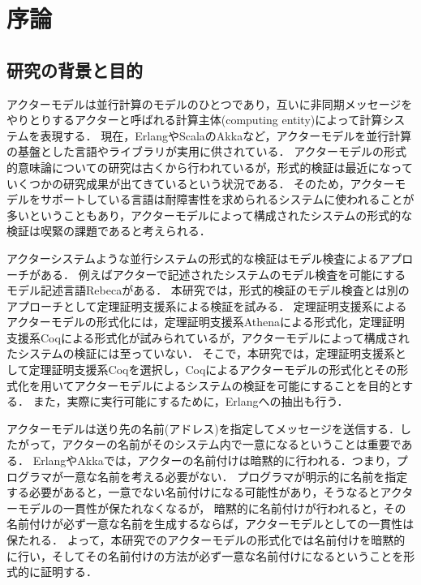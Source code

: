 \chapter{序論}
\label{chapter:intro}

\section{研究の背景と目的}
アクターモデル\cite{Agha:1986aa}は並行計算のモデルのひとつであり，互いに非同期メッセージをやりとりするアクターと呼ばれる計算主体(computing entity)によって計算システムを表現する．
現在，Erlang\cite{Erlang}やScala\cite{Scala}のAkka\cite{Akka}など，アクターモデルを並行計算の基盤とした言語やライブラリが実用に供されている．
アクターモデルの形式的意味論についての研究は古くから行われているが，形式的検証は最近になっていくつかの研究成果が出てきているという状況である．
そのため，アクターモデルをサポートしている言語は耐障害性を求められるシステムに使われることが多いということもあり，アクターモデルによって構成されたシステムの形式的な検証は喫緊の課題であると考えられる．

アクターシステムような並行システムの形式的な検証はモデル検査によるアプローチがある．
例えばアクターで記述されたシステムのモデル検査を可能にするモデル記述言語Rebeca\cite{Sirjani:2011aa}がある．
本研究では，形式的検証のモデル検査とは別のアプローチとして定理証明支援系による検証を試みる．
定理証明支援系によるアクターモデルの形式化には，定理証明支援系Athenaによる形式化\cite{Musser:2013aa}，定理証明支援系Coqによる形式化\cite{Garnock-Jones:2014aa}が試みられているが，アクターモデルによって構成されたシステムの検証には至っていない．
そこで，本研究では，定理証明支援系として定理証明支援系Coqを選択し，Coqによるアクターモデルの形式化とその形式化を用いてアクターモデルによるシステムの検証を可能にすることを目的とする．
また，実際に実行可能にするために，Erlangへの抽出も行う．

アクターモデルは送り先の名前(アドレス)を指定してメッセージを送信する．したがって，アクターの名前がそのシステム内で一意になるということは重要である．
ErlangやAkkaでは，アクターの名前付けは暗黙的に行われる．つまり，プログラマが一意な名前を考える必要がない．
プログラマが明示的に名前を指定する必要があると，一意でない名前付けになる可能性があり，そうなるとアクターモデルの一貫性が保たれなくなるが，
暗黙的に名前付けが行われると，その名前付けが必ず一意な名前を生成するならば，アクターモデルとしての一貫性は保たれる．
よって，本研究でのアクターモデルの形式化では名前付けを暗黙的に行い，そしてその名前付けの方法が必ず一意な名前付けになるということを形式的に証明する．

